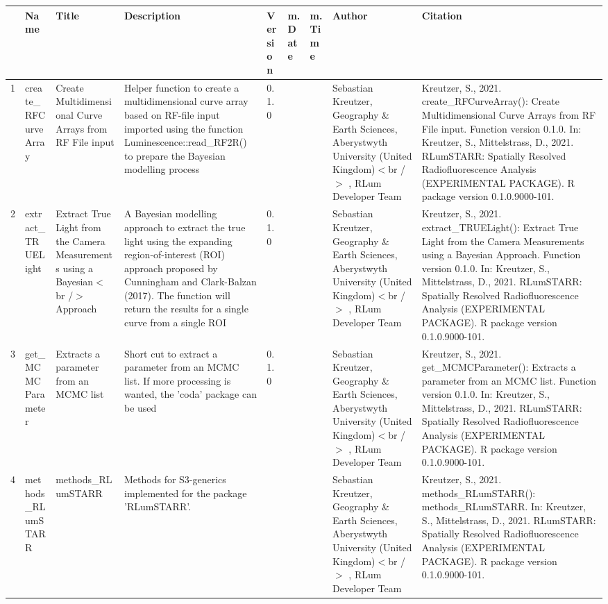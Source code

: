 \begin{table}[ht]
\centering
\begin{tabular}{rllllllll}
  \hline
 & Name & Title & Description & Version & m.Date & m.Time & Author & Citation \\ 
  \hline
1 & create\_RFCurveArray & Create Multidimensional Curve Arrays from RF File input & Helper function to create a multidimensional curve array based on RF-file input imported using the function  Luminescence::read\_RF2R()  to prepare the Bayesian modelling process & 0.1.0
 &  &  & Sebastian Kreutzer, Geography \& Earth Sciences, Aberystwyth University (United Kingdom)$<$br /$>$ , RLum Developer Team & Kreutzer, S., 2021. create\_RFCurveArray(): Create Multidimensional Curve Arrays from RF File input. Function version 0.1.0. In: Kreutzer, S., Mittelstrass, D., 2021. RLumSTARR: Spatially Resolved Radiofluorescence Analysis (EXPERIMENTAL PACKAGE). R package version 0.1.0.9000-101. 
 \\ 
  2 & extract\_TRUELight & Extract True Light from the Camera Measurements using a Bayesian$<$br /$>$ Approach & A Bayesian modelling approach to extract the true light using the expanding region-of-interest (ROI) approach proposed by Cunningham and Clark-Balzan (2017). The function will return the results for a  single  curve from a  single  ROI & 0.1.0
 &  &  & Sebastian Kreutzer, Geography \& Earth Sciences, Aberystwyth University (United Kingdom)$<$br /$>$ , RLum Developer Team & Kreutzer, S., 2021. extract\_TRUELight(): Extract True Light from the Camera Measurements using a Bayesian Approach. Function version 0.1.0. In: Kreutzer, S., Mittelstrass, D., 2021. RLumSTARR: Spatially Resolved Radiofluorescence Analysis (EXPERIMENTAL PACKAGE). R package version 0.1.0.9000-101. 
 \\ 
  3 & get\_MCMCParameter & Extracts a parameter from an MCMC list & Short cut to extract a parameter from an MCMC list. If more processing is wanted, the  'coda'  package can be used & 0.1.0
 &  &  & Sebastian Kreutzer, Geography \& Earth Sciences, Aberystwyth University (United Kingdom)$<$br /$>$ , RLum Developer Team & Kreutzer, S., 2021. get\_MCMCParameter(): Extracts a parameter from an MCMC list. Function version 0.1.0. In: Kreutzer, S., Mittelstrass, D., 2021. RLumSTARR: Spatially Resolved Radiofluorescence Analysis (EXPERIMENTAL PACKAGE). R package version 0.1.0.9000-101. 
 \\ 
  4 & methods\_RLumSTARR & methods\_RLumSTARR & Methods for S3-generics implemented for the package 'RLumSTARR'. &  &  &  & Sebastian Kreutzer, Geography \& Earth Sciences, Aberystwyth University (United Kingdom)$<$br /$>$ , RLum Developer Team & Kreutzer, S., 2021. methods\_RLumSTARR(): methods\_RLumSTARR. In: Kreutzer, S., Mittelstrass, D., 2021. RLumSTARR: Spatially Resolved Radiofluorescence Analysis (EXPERIMENTAL PACKAGE). R package version 0.1.0.9000-101. 

\end{tabular}
\end{table}
